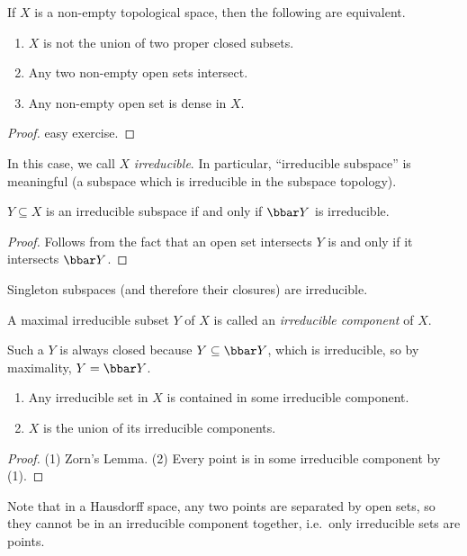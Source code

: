  \begin{proposition}
   If $X$ is a non-empty topological space, then the following are equivalent.
   \begin{enumerate}
     \item $X$ is not the union of two proper closed subsets.
     \item Any two non-empty open sets intersect.
     \item Any non-empty open set is dense in $X$.
   \end{enumerate}
 \end{proposition}
 \begin{proof}
   easy exercise.
 \end{proof}
 In this case, we call $X$ \emph{irreducible}. In particular, ``irreducible subspace'' is
 meaningful (a subspace which is irreducible in the subspace topology).
 \begin{corollary}
   $Y\subseteq X$ is an irreducible subspace if and only if $\bbar Y$ is irreducible.
 \end{corollary}
 \begin{proof}
   Follows from the fact that an open set intersects $Y$ is and only if it intersects
   $\bbar Y$.
 \end{proof}
 \begin{example}
   Singleton subspaces (and therefore their closures) are irreducible.
 \end{example}
 \begin{definition}
   A maximal irreducible subset $Y$ of $X$ is called an \emph{irreducible component} of $X$.
 \end{definition}
 Such a $Y$ is always closed because $Y\subseteq \bbar Y$, which is irreducible, so by
 maximality, $Y=\bbar Y$.
 \begin{proposition}
   \begin{enumerate}
     \item Any irreducible set in $X$ is contained in some irreducible component.
     \item $X$ is the union of its irreducible components.
   \end{enumerate}
 \end{proposition}
 \begin{proof}
   (1) Zorn's Lemma.
   (2) Every point is in some irreducible component by (1).
 \end{proof}
 Note that in a Hausdorff space, any two points are separated by open sets, so they
 cannot be in an irreducible component together, i.e.\ only irreducible sets are points.

